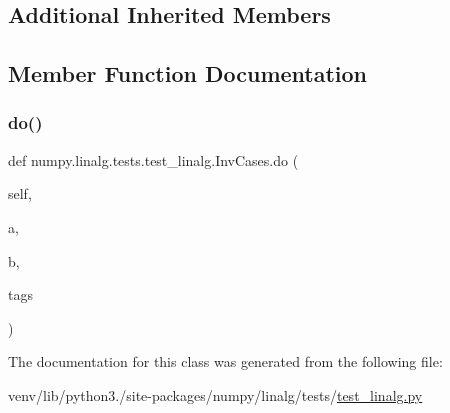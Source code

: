 \subsection*{Additional Inherited Members}


\subsection{Member Function Documentation}
\mbox{\label{classnumpy_1_1linalg_1_1tests_1_1test__linalg_1_1InvCases_a0f31804f16b2bdb3a13f276c9efcd880}} 
\subsubsection{\texorpdfstring{do()}{do()}}
{\footnotesize\ttfamily def numpy.\+linalg.\+tests.\+test\+\_\+linalg.\+Inv\+Cases.\+do (\begin{DoxyParamCaption}\item[{}]{self,  }\item[{}]{a,  }\item[{}]{b,  }\item[{}]{tags }\end{DoxyParamCaption})}



The documentation for this class was generated from the following file\+:\begin{DoxyCompactItemize}
\item 
venv/lib/python3./site-\/packages/numpy/linalg/tests/\hyperlink{test__linalg_8py}{test\+\_\+linalg.\+py}\end{DoxyCompactItemize}
